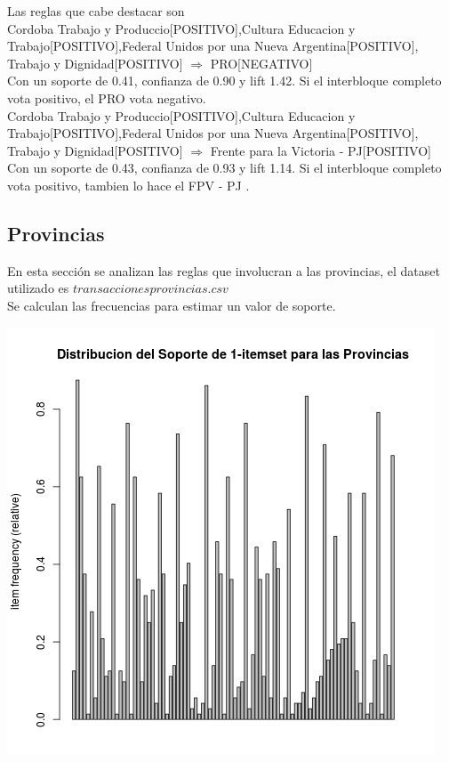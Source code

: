 \documentclass{endm}
\begin{document}
Las reglas que cabe destacar son \\

{Cordoba Trabajo y Produccio[POSITIVO],Cultura Educacion y Trabajo[POSITIVO],Federal Unidos por una Nueva Argentina[POSITIVO],     Trabajo y Dignidad[POSITIVO]} $\Longrightarrow$ {PRO[NEGATIVO]}  \\

Con un soporte de 0.41, confianza de  0.90 y lift 1.42. Si el interbloque completo vota positivo, el PRO vota negativo. \\

{Cordoba Trabajo y Produccio[POSITIVO],Cultura Educacion y Trabajo[POSITIVO],Federal Unidos por una Nueva Argentina[POSITIVO], Trabajo y Dignidad[POSITIVO]} $\Longrightarrow$ {Frente para la Victoria - PJ[POSITIVO]}  \\

Con un soporte de 0.43, confianza de  0.93 y lift 1.14. Si el interbloque completo vota positivo, tambien lo hace el FPV - PJ . \\

\subsection{Provincias} 

En esta sección se analizan las reglas que involucran a las provincias, el dataset utilizado es $transacciones provincias.csv$ \\

Se calculan las frecuencias para estimar un valor de soporte. \\

\begin{center}
\includegraphics[scale=0.4]{graficos/soportesProvincias.png}
\end{center}
\end{document}
